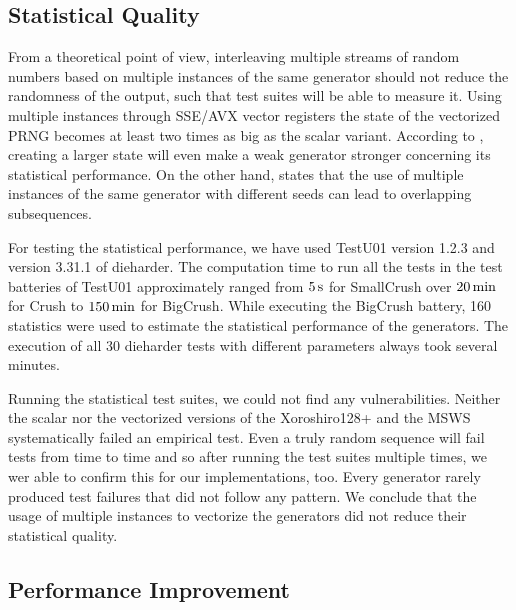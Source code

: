 \documentclass{stdlocal}
\begin{document}
  \subsection{Statistical Quality} %
  \label{sub:statistical_quality}
    From a theoretical point of view, interleaving multiple streams of random numbers based on multiple instances of the same generator should not reduce the randomness of the output, such that test suites will be able to measure it.
    Using multiple instances through SSE/AVX vector registers the state of the vectorized PRNG becomes at least two times as big as the scalar variant.
    According to \textcite{oneill-blog-toobig}, creating a larger state will even make a weak generator stronger concerning its statistical performance.
    On the other hand, \textcite{fog2015} states that the use of multiple instances of the same generator with different seeds can lead to overlapping subsequences.

    For testing the statistical performance, we have used TestU01 version 1.2.3 and version 3.31.1 of dieharder.
    The computation time to run all the tests in the test batteries of TestU01 approximately ranged from $5\, \mathrm{s}$ for SmallCrush over $20\, \mathrm{min}$ for Crush to $150\, \mathrm{min}$ for BigCrush.
    While executing the BigCrush battery, 160 statistics were used to estimate the statistical performance of the generators.
    The execution of all 30 dieharder tests with different parameters always took several minutes.

    Running the statistical test suites, we could not find any vulnerabilities.
    Neither the scalar nor the vectorized versions of the Xoroshiro128+ and the MSWS systematically failed an empirical test.
    Even a truly random sequence will fail tests from time to time \autocite[\pno~142]{kneusel2018} and so after running the test suites multiple times, we wer able to confirm this for our implementations, too.
    Every generator rarely produced test failures that did not follow any pattern.
    We conclude that the usage of multiple instances to vectorize the generators did not reduce their statistical quality.

  \subsection{Performance Improvement} %
  \label{sub:performance_improvement}
\end{document}
